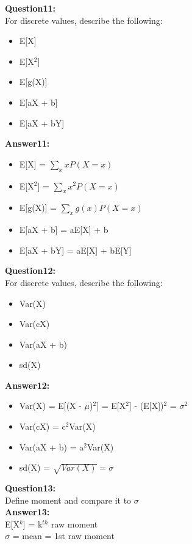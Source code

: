 \documentclass{article}
\begin{document}
\textbf{Question11:} \\
For discrete values, describe the following:\\
\begin{itemize}
	\item E[X]
	\item E[X$^2$]
	\item E[g(X)]
	\item E[aX + b]
	\item E[aX + bY]
\end{itemize}

\textbf{Answer11:} \\
\begin{itemize}
	\item E[X] = $\sum_{x} xP(X=x)$
	\item E[X$^2$] = $\sum_{x} x^2P(X=x)$
	\item E[g(X)] = $\sum_{x} g(x)P(X=x)$
	\item E[aX + b] = aE[X] + b
	\item E[aX + bY] = aE[X] + bE[Y]
\end{itemize}


\textbf{Question12:} \\
For discrete values, describe the following:\\
\begin{itemize}
	\item Var(X)
	\item Var(cX)
	\item Var(aX + b)
	\item sd(X)
\end{itemize}

\textbf{Answer12:} \\
\begin{itemize}
	\item Var(X) = E[(X - $\mu$)$^2$] = E[X$^2$] - (E[X])$^2$ = $\sigma^2$
	\item Var(cX) = c$^2$Var(X)
	\item Var(aX + b) = a$^2$Var(X)
	\item sd(X) = $\sqrt{Var(X)} = \sigma$
\end{itemize}


\textbf{Question13:} \\
Define moment and compare it to $\sigma$
\\

\textbf{Answer13:} \\
E[X$^k$] = k$^{th}$ raw moment\\
$\sigma$ = mean = 1st raw moment
\\\\
\end{document}
